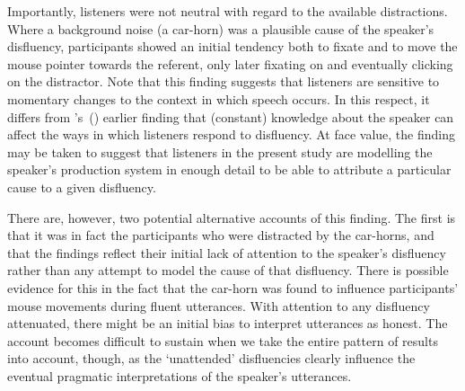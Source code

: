 \documentclass[a4paper,man,natbib]{apa6}
\newcommand*{\citegen}[1]{\citeauthor{#1}'s~(\citeyear{#1})}
\begin{document}
Importantly, listeners were not neutral with regard to the available distractions.
Where a background noise (a car-horn) was a plausible cause of the speaker's disfluency, participants showed an initial tendency both to fixate and to move the mouse pointer towards the referent, only later fixating on and eventually clicking on the distractor.
Note that this finding suggests that listeners are sensitive to momentary changes to the context in which speech occurs.
In this respect, it differs from \citegen{Arnold2007} earlier finding that (constant) knowledge about the speaker can affect the ways in which listeners respond to disfluency.
At face value, the finding may be taken to suggest that listeners in the present study are modelling the speaker's production system in enough detail to be able to attribute a particular cause to a given disfluency.

There are, however, two potential alternative accounts of this finding.
The first is that it was in fact the participants who were distracted by the car-horns, and that the findings reflect their initial lack of attention to the speaker's disfluency rather than any attempt to model the cause of that disfluency.
There is possible evidence for this in the fact that the car-horn was found to influence participants' mouse movements during fluent utterances. 
With attention to any disfluency attenuated, there might be an initial bias to interpret utterances as honest. 
The account becomes difficult to sustain when we take the entire pattern of results into account, though, as the `unattended' disfluencies clearly influence the eventual pragmatic interpretations of the speaker's utterances.
\end{document}
